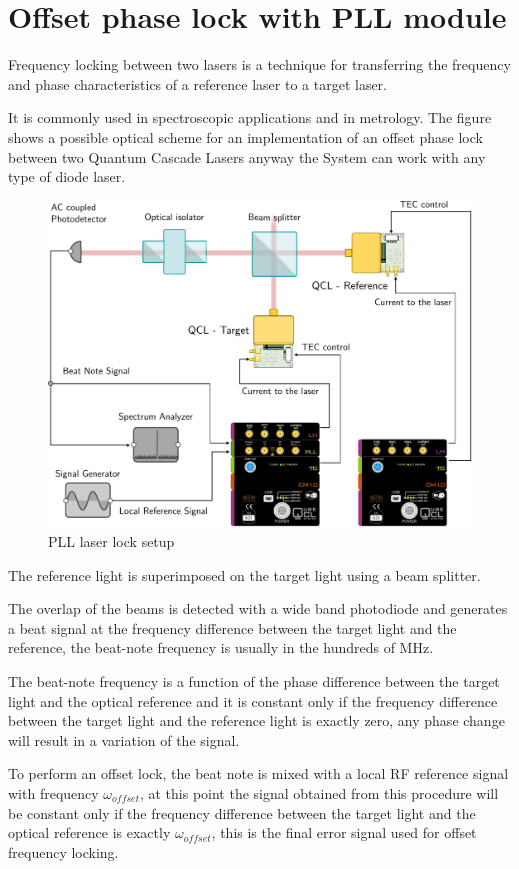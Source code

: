 \newpage
\section{Offset phase lock with PLL module}

Frequency locking between two lasers is a technique for transferring the frequency and phase characteristics of a reference laser to a target laser.

It is commonly used in spectroscopic applications and in metrology.
\newline
The figure shows a possible optical scheme for an implementation of an offset phase lock between two Quantum Cascade Lasers anyway the \QubeModel  System can work with any type of diode laser.
\begin{figure}[H]
\centering
\includegraphics[width=12cm]{images/PLL_EXPERIMENT_DEMO.pdf}
\caption{PLL laser lock setup}
\end{figure}
The reference light is superimposed on the target light using a beam splitter.

The overlap of the beams is detected with a wide band photodiode and generates a beat signal at the frequency difference between the target light and the reference,
the beat-note frequency is usually in the hundreds of MHz.

The beat-note frequency is a function of the phase difference between the target light and the optical reference and it is constant only if the frequency difference between the target light and the reference light is exactly zero, any phase change will result in a variation of the signal.

To perform an offset lock, the beat note is mixed with a local RF reference  signal with frequency $\omega_{offset}$, 
at this point the signal obtained from this procedure will be constant only if the frequency difference between the target light and the optical reference is exactly $\omega_{offset}$, this is the final error signal used for offset frequency locking.

